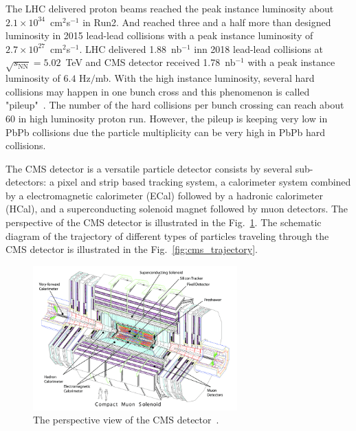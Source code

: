 The LHC delivered proton beams reached the peak instance luminosity about $2.1\times 10^{34}$~cm$^2$s$^{-1}$ in Run2. And reached three and a half more than designed luminosity in 2015 lead-lead collisions with a peak instance luminosity of $2.7\times10^{27}$~cm$^2$s$^{-1}$. LHC delivered 1.88~nb$^{-1}$ inn 2018 lead-lead collisions at $\sqrt{s_{\text{NN}}}=5.02$~TeV and CMS detector received 1.78~nb$^{-1}$ with a peak instance luminosity of $6.4$ Hz$/$mb. With the high instance luminosity, several hard collisions may happen in one bunch cross and this phenomenon is called "pileup"~\cite{Sirunyan:2020foa}. The number of the hard collisions per bunch crossing can reach about 60 in high luminosity proton run. However, the pileup is keeping very low in PbPb collisions due the particle multiplicity can be very high in PbPb hard collisions.

The CMS detector is a versatile particle detector consists by several sub-detectors: a pixel and strip based tracking system, a calorimeter system combined by a electromagnetic calorimeter (ECal) followed by a hadronic calorimeter (HCal), and a superconducting solenoid magnet followed by muon detectors. The perspective of the CMS detector is illustrated in the Fig.~\ref{fig:cms_perspective}. The schematic diagram of the trajectory of different types of particles traveling through the CMS detector is illustrated in the Fig.~\ref{fig:cms_trajectory}.

\begin{figure}[ht]
  \begin{center}
    \includegraphics[width=0.7\textwidth]{figures/detector/cms_detector_prespective.png}
  \end{center}
  \caption{The perspective view of the CMS detector~\cite{Chatrchyan:2008aa}.}
  \label{fig:cms_perspective}
\end{figure}

